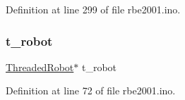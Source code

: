 Definition at line 299 of file rbe2001.\+ino.

\mbox{\label{rbe2001_8ino_a5356aea93c7a0c5118c1294971a0c68d}} 
\subsubsection{\texorpdfstring{t\+\_\+robot}{t\_robot}}
{\footnotesize\ttfamily \hyperlink{class_threaded_robot}{Threaded\+Robot}$\ast$ t\+\_\+robot}



Definition at line 72 of file rbe2001.\+ino.

